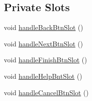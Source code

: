 \subsection*{Private Slots}
\begin{DoxyCompactItemize}
\item 
void \hyperlink{class_new_project_gui_ae8c086687f029bada59f3934aa16ad9b}{handle\-Back\-Btn\-Slot} ()
\item 
void \hyperlink{class_new_project_gui_a247f62254e88454615d89be32464ce28}{handle\-Next\-Btn\-Slot} ()
\item 
void \hyperlink{class_new_project_gui_ad47832cd6388ea36101b1e0002837546}{handle\-Finish\-Btn\-Slot} ()
\item 
void \hyperlink{class_new_project_gui_a241a3a40b5f749cff7813e29c169b742}{handle\-Help\-Bnt\-Slot} ()
\item 
void \hyperlink{class_new_project_gui_ad25d0850e202e697203583fb4665004e}{handle\-Cancel\-Btn\-Slot} ()
\end{DoxyCompactItemize}
